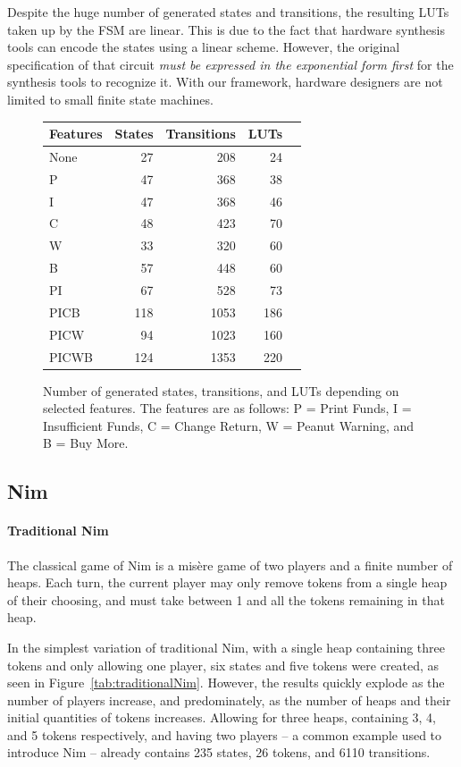 \documentclass[sigplan,anonymous,review]{acmart}
\begin{document}
Despite the huge number of generated states and transitions, the resulting LUTs taken up by the FSM are linear. This is due to the fact that hardware synthesis tools can encode the states using a linear scheme. However, the original specification of that circuit \textit{must be expressed in the exponential form first} for the synthesis tools to recognize it. With our framework, hardware designers are not limited to small finite state machines.

\begin{figure}
    \centering
\begin{tabular}{lrrrr}\toprule
Features &States &Transitions &LUTs \\\midrule
None &27 &208 &24 \\
P &47 &368 &38 \\
I &47 &368 &46 \\
C &48 &423 &70 \\
W &33 &320 &60 \\
B &57 &448 &60 \\
PI &67 &528 &73 \\
PICB &118 &1053 &186 \\
PICW &94 &1023 &160 \\
PICWB &124 &1353 &220 \\
\bottomrule
\end{tabular}
    \caption{Number of generated states, transitions, and LUTs depending on selected features. The features are as follows: P = Print Funds, I = Insufficient Funds, C = Change Return, W = Peanut Warning, and B = Buy More.}
    \label{fig:vmData}
\end{figure}

\subsection{Nim}\label{sec:nimresults}
\paragraph{Traditional Nim}
The classical game of Nim is a mis\`{e}re game of two players and a finite number of heaps. Each turn, the current player may only remove tokens from a single heap of their choosing, and must take between 1 and all the tokens remaining in that heap. 

In the simplest variation of traditional Nim, with a single heap containing three tokens and only allowing one player, six states and five tokens were created, as seen in Figure~\ref{tab:traditionalNim}. However, the results quickly explode as the number of players increase, and predominately, as the number of heaps and their initial quantities of tokens increases. Allowing for three heaps, containing 3, 4, and 5 tokens respectively, and having two players -- a common example used to introduce Nim -- already contains 235 states, 26 tokens, and 6110 transitions. 
\end{document}
